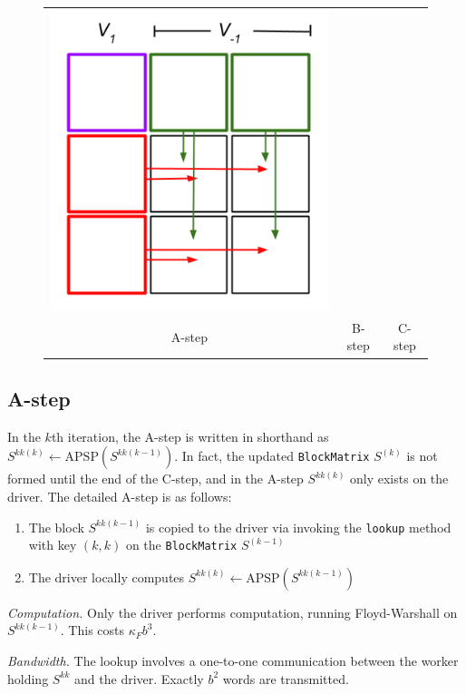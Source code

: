 \documentclass{article} %
\begin{document}
\begin{figure}[h]
\begin{tabular}{ccc}
\includegraphics[scale = 0.3, trim = 0in -0.55in 0in 0in, clip]{blockApsp-4.png}\\
A-step & B-step & C-step
\end{tabular}
\end{figure}


\subsection{A-step}

In the $k$th iteration, the A-step is written in shorthand as
$S^{kk(k)} \leftarrow \text{APSP}(S^{kk(k-1)})$.  In fact, the updated
{\tt BlockMatrix} $S^{(k)}$ is not formed until the end of the C-step,
and in the A-step $S^{kk(k)}$ only exists on the driver.
The detailed A-step is as follows:
\begin{enumerate}
\item The block $S^{kk(k-1)}$ is copied to the driver via invoking the {\tt lookup} method with key $(k, k)$ on the {\tt  BlockMatrix} $S^{(k-1)}$
\item The driver locally computes $S^{kk(k)} \leftarrow \text{APSP}(S^{kk(k-1)})$
\end{enumerate}

\emph{Computation.} Only the driver performs computation, running
Floyd-Warshall on $S^{kk(k-1)}$.  This costs $\kappa_F b^3$.

\emph{Bandwidth.}
The lookup involves a one-to-one communication between the worker holding $S^{kk}$ and the driver.
Exactly $b^2$ words are transmitted.
\end{document}
